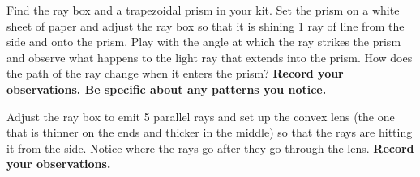 \begin{steps}
	\item Find the ray box and a trapezoidal prism in your kit. Set the prism on a white sheet of paper and adjust the ray box so that it is shining 1 ray of line from the side and onto the prism. Play with the angle at which the ray strikes the prism and observe what happens to the light ray that extends into the prism. How does the path of the ray change when it enters the prism? \textbf{Record your observations. Be specific about any patterns you notice.}
	
	
	
	
	
	\item Adjust the ray box to emit 5 parallel rays and set up the convex lens (the one that is thinner on the ends and thicker in the middle) so that the rays are hitting it from the side. Notice where the rays go after they go through the lens. \textbf{Record your observations.}
\end{steps}

